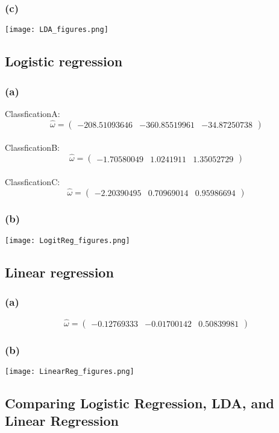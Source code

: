 \documentclass[9pt]{article}
\begin{document}
\subsubsection{(c)}
\texttt{[image: LDA\_figures.png]}

\subsection{Logistic regression}
\subsubsection{(a)}
ClassficationA:
\[
\hat{\omega} =
\begin{pmatrix}
  -208.51093646 & -360.85519961 & -34.87250738
\end{pmatrix}
\]
\\
ClassficationB:
\[
\hat{\omega} =
\begin{pmatrix}
  -1.70580049 & 1.0241911 & 1.35052729
\end{pmatrix}
\]
\\
ClassficationC:
\[
\hat{\omega} =
\begin{pmatrix}
  -2.20390495 & 0.70969014 & 0.95986694
\end{pmatrix}
\]
\subsubsection{(b)}
\texttt{[image: LogitReg\_figures.png]}

\subsection{Linear regression}
\subsubsection{(a)}
\[
\hat{\omega} =
\begin{pmatrix}
  -0.12769333 & -0.01700142 &  0.50839981
\end{pmatrix}
\]

\subsubsection{(b)}
\begin{center}
\texttt{[image: LinearReg\_figures.png]}
\end{center}

\subsection{Comparing Logistic Regression, LDA, and Linear Regression}
\end{document}
